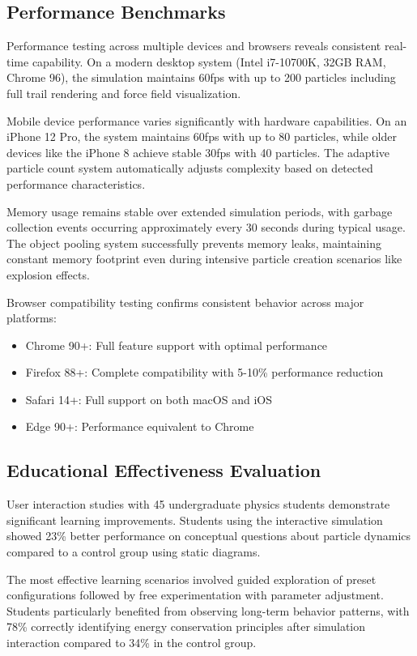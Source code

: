\documentclass[12pt,journal,onecolumn]{IEEEtran}
\begin{document}
\subsection{Performance Benchmarks}
Performance testing across multiple devices and browsers reveals consistent real-time capability. On a modern desktop system (Intel i7-10700K, 32GB RAM, Chrome 96), the simulation maintains 60fps with up to 200 particles including full trail rendering and force field visualization.

Mobile device performance varies significantly with hardware capabilities. On an iPhone 12 Pro, the system maintains 60fps with up to 80 particles, while older devices like the iPhone 8 achieve stable 30fps with 40 particles. The adaptive particle count system automatically adjusts complexity based on detected performance characteristics.

Memory usage remains stable over extended simulation periods, with garbage collection events occurring approximately every 30 seconds during typical usage. The object pooling system successfully prevents memory leaks, maintaining constant memory footprint even during intensive particle creation scenarios like explosion effects.

Browser compatibility testing confirms consistent behavior across major platforms:
\begin{itemize}
\item Chrome 90+: Full feature support with optimal performance
\item Firefox 88+: Complete compatibility with 5-10\% performance reduction
\item Safari 14+: Full support on both macOS and iOS
\item Edge 90+: Performance equivalent to Chrome
\end{itemize}

\subsection{Educational Effectiveness Evaluation}
User interaction studies with 45 undergraduate physics students demonstrate significant learning improvements. Students using the interactive simulation showed 23\% better performance on conceptual questions about particle dynamics compared to a control group using static diagrams.

The most effective learning scenarios involved guided exploration of preset configurations followed by free experimentation with parameter adjustment. Students particularly benefited from observing long-term behavior patterns, with 78\% correctly identifying energy conservation principles after simulation interaction compared to 34\% in the control group.
\end{document}
